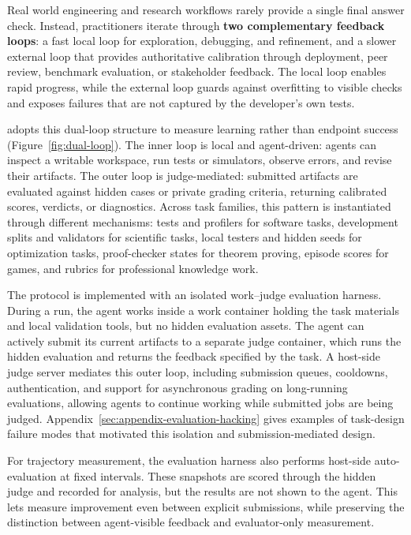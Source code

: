 Real world engineering and research workflows rarely provide a single final answer check. Instead, practitioners iterate through \textbf{two complementary feedback loops}: a fast local loop for exploration, debugging, and refinement, and a slower external loop that provides authoritative calibration through deployment, peer review, benchmark evaluation, or stakeholder feedback. The local loop enables rapid progress, while the external loop guards against overfitting to visible checks and exposes failures that are not captured by the developer's own tests.

\benchmark{} adopts this dual-loop structure to measure learning rather than endpoint success (Figure~\ref{fig:dual-loop}). The inner loop is local and agent-driven: agents can inspect a writable workspace, run tests or simulators, observe errors, and revise their artifacts. The outer loop is judge-mediated: submitted artifacts are evaluated against hidden cases or private grading criteria, returning calibrated scores, verdicts, or diagnostics. Across task families, this pattern is instantiated through different mechanisms: tests and profilers for software tasks, development splits and validators for scientific tasks, local testers and hidden seeds for optimization tasks, proof-checker states for theorem proving, episode scores for games, and rubrics for professional knowledge work.

The protocol is implemented with an isolated work--judge evaluation harness. During a run, the agent works inside a work container holding the task materials and local validation tools, but no hidden evaluation assets. The agent can actively submit its current artifacts to a separate judge container, which runs the hidden evaluation and returns the feedback specified by the task. A host-side judge server mediates this outer loop, including submission queues, cooldowns, authentication, and support for asynchronous grading on long-running evaluations, allowing agents to continue working while submitted jobs are being judged. Appendix~\ref{sec:appendix-evaluation-hacking} gives examples of task-design failure modes that motivated this isolation and submission-mediated design.

For trajectory measurement, the evaluation harness also performs host-side auto-evaluation at fixed intervals. These snapshots are scored through the hidden judge and recorded for analysis, but the results are not shown to the agent. This lets \benchmark{} measure improvement even between explicit submissions, while preserving the distinction between agent-visible feedback and evaluator-only measurement.
